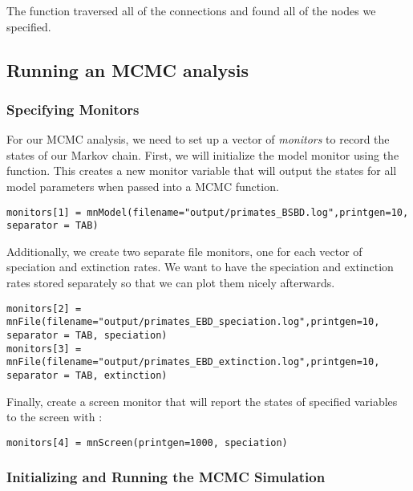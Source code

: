 The  function traversed all of the connections and found all of the nodes we specified. 


\subsection{Running an MCMC analysis}

\subsubsection{Specifying Monitors}

For our MCMC analysis, we need to set up a vector of \textit{monitors} to record the states of our Markov chain. 
First, we will initialize the model monitor using the  function. This creates a new monitor variable that will output the states for all model parameters when passed into a MCMC function. 
{\tt \begin{snugshade*}
\begin{lstlisting}
monitors[1] = mnModel(filename="output/primates_BSBD.log",printgen=10, separator = TAB)
\end{lstlisting}
\end{snugshade*}}

Additionally, we create two separate file monitors, one for each vector of speciation and extinction rates.
We want to have the speciation and extinction rates stored separately so that we can plot them nicely afterwards.
{\tt \begin{snugshade*}
\begin{lstlisting}
monitors[2] = mnFile(filename="output/primates_EBD_speciation.log",printgen=10, separator = TAB, speciation)
monitors[3] = mnFile(filename="output/primates_EBD_extinction.log",printgen=10, separator = TAB, extinction)
\end{lstlisting}
\end{snugshade*}}

Finally, create a screen monitor that will report the states of specified variables to the screen with :
{\tt \begin{snugshade*}
\begin{lstlisting}
monitors[4] = mnScreen(printgen=1000, speciation)
\end{lstlisting}
\end{snugshade*}}

\subsubsection{Initializing and Running the MCMC Simulation}

